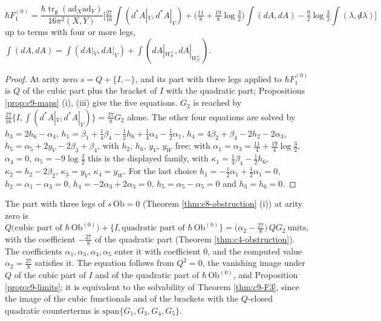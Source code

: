 \begin{theorem}
\begin{equation}
\hbar F_1^{(0)}=\frac{\hbar\operatorname{tr}_{\mathfrak g}(\mathrm{ad}_X\mathrm{ad}_Y)}{16\pi^2(X,Y)}\Big[\tfrac{27}{16}\int(d^*A|_V,d^*A|_V)+\big(\tfrac{11}8+\tfrac{19}8\log\tfrac32\big)\int(dA,dA)-\tfrac92\log\tfrac32\int(\lambda,{\not d}\lambda)\Big]
\label{eq:c9-F2rep}
\end{equation}
up to terms with four or more legs, $\int(dA,dA)=\int(dA|_V,dA|_V)+\int(dA|_{W_{\mathbb R}^\perp},dA|_{W_{\mathbb R}^\perp})$.
\end{theorem}

\begin{proof}
At arity zero $s=Q+\{I,-\}$, and its part with three legs applied to $\hbar F_1^{(0)}$ is $Q$ of the cubic part plus the bracket of $I$ with the quadratic part; Propositions \ref{prop:c9-maps} (i), (iii) give the five equations. $G_2$ is reached by $\tfrac{27}{16}\{I,\int(d^*A|_V,d^*A|_V)\}=\tfrac{27}8G_2$ alone. The other four equations are solved by $h_3=2h_6-\alpha_4$, $h_1=\beta_1+\tfrac14\beta_4-\tfrac12h_6+\tfrac14\alpha_4-\tfrac12\alpha_1$, $h_4=4\beta_2+\beta_4-2h_2-2\alpha_3$, $h_5=\alpha_5+2y_V-2\beta_3+\beta_4$, with $h_2$, $h_6$, $y_V$, $y_W$ free; with $\alpha_1=\alpha_3=\tfrac{11}4+\tfrac{19}4\log\tfrac32$, $\alpha_4=0$, $\alpha_5=-9\log\tfrac32$ this is the displayed family, with $\kappa_1=\tfrac14\beta_4-\tfrac12h_6$, $\kappa_2=h_2-2\beta_2$, $\kappa_3=y_V$, $\kappa_4=y_W$. For the last choice $h_1=-\tfrac12\alpha_1+\tfrac12\alpha_1=0$, $h_2=\alpha_1-\alpha_3=0$, $h_4=-2\alpha_3+2\alpha_3=0$, $h_5=\alpha_5-\alpha_5=0$ and $h_3=h_6=0$.
\end{proof}

\begin{theorem}
\label{thm:c9-wz}
The part with three legs of $s\,\mathrm{Ob}=0$ (Theorem \ref{thm:c8-obstruction} (i)) at arity zero is
\[
Q\big(\text{cubic part of }\hbar\,\mathrm{Ob}^{(0)}\big)+\big\{I,\text{quadratic part of }\hbar\,\mathrm{Ob}^{(0)}\big\}=\big(\alpha_2-\tfrac{27}8\big)\,QG_2\ \text{units},
\]
with the coefficient $-\tfrac{27}8$ of the quadratic part (Theorem \ref{thm:c4-obstruction}). The coefficients $\alpha_1,\alpha_3,\alpha_4,\alpha_5$ enter it with coefficient $0$, and the computed value $\alpha_2=\tfrac{27}8$ satisfies it. The equation follows from $Q^2=0$, the vanishing image under $Q$ of the cubic part of $I$ and of the quadratic part of $\hbar\,\mathrm{Ob}^{(0)}$, and Proposition \ref{prop:c9-limits}; it is equivalent to the solvability of Theorem \ref{thm:c9-F3}, since the image of the cubic functionals and of the brackets with the $Q$-closed quadratic counterterms is $\mathrm{span}\{G_1,G_3,G_4,G_5\}$.
\end{theorem}


